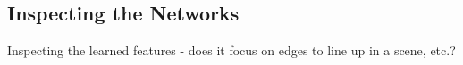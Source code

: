 \documentclass[letterpaper, 10 pt, conference, final]{ieeeconf}   %
\begin{document}



\subsection{Inspecting the Networks}

Inspecting the learned features - does it focus on edges to line up in a scene, etc.?



\end{document}

